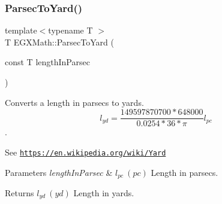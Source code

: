 \subsubsection{\texorpdfstring{Parsec\+To\+Yard()}{ParsecToYard()}}
{\footnotesize\ttfamily template$<$typename T $>$ \\
T E\+G\+X\+Math\+::\+Parsec\+To\+Yard (\begin{DoxyParamCaption}\item[{const T}]{length\+In\+Parsec }\end{DoxyParamCaption})}



Converts a length in parsecs to yards. \[ l_{yd}= \frac{149597870700 * 648000}{0.0254 * 36 * \pi} l_{pc} \]. 

See \href{https://en.wikipedia.org/wiki/Yard}{\tt https\+://en.\+wikipedia.\+org/wiki/\+Yard} 
\begin{DoxyParams}{Parameters}
{\em length\+In\+Parsec} & $ l_{pc}\ (pc)$ Length in parsecs. \\
\hline
\end{DoxyParams}
\begin{DoxyReturn}{Returns}
$ l_{yd}\ (yd)$ Length in yards. 
\end{DoxyReturn}

